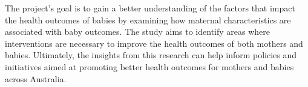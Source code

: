 The project's goal is to gain a better understanding of the factors that impact the health outcomes of babies by examining how maternal characteristics are associated with baby outcomes. The study aims to identify areas where interventions are necessary to improve the health outcomes of both mothers and babies. Ultimately, the insights from this research can help inform policies and initiatives aimed at promoting better health outcomes for mothers and babies across Australia.